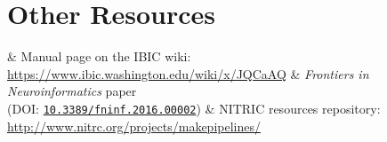 \documentclass[oneside,11pt,]{memoir}
\begin{document}
	\cleardoublepage
	
	
	
	\section{Other Resources}	
	\noindent
	\begin{easylist}[itemize]
		& Manual page on the IBIC wiki: \\ \url{https://www.ibic.washington.edu/wiki/x/JQCaAQ}
		& \textit{Frontiers in Neuroinformatics} paper \\ (DOI: \href{http://journal.frontiersin.org/article/10.3389/fninf.2016.00002/full}{\texttt{10.3389/fninf.2016.00002}})
		& NITRIC resources repository: \\ \url{http://www.nitrc.org/projects/makepipelines/}
	\end{easylist}
	
\end{document}
